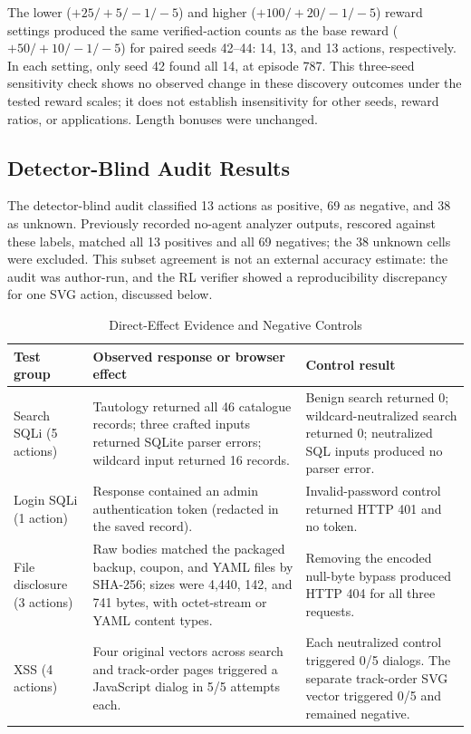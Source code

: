 \documentclass[conference, a4paper]{IEEEtran}
\begin{document}
The lower ($+25/+5/-1/-5$) and higher ($+100/+20/-1/-5$)
reward settings produced the same verified-action counts as the
base reward ($+50/+10/-1/-5$) for paired seeds 42--44: 14, 13,
and 13 actions, respectively. In each setting, only seed 42
found all 14, at episode 787. This three-seed sensitivity check
shows no observed change in these discovery outcomes under the
tested reward scales; it does not establish insensitivity for
other seeds, reward ratios, or applications. Length bonuses
were unchanged.

\subsection{Detector-Blind Audit Results}

The detector-blind audit classified 13 actions as positive, 69 as
negative, and 38 as unknown. Previously recorded no-agent analyzer
outputs, rescored against these labels, matched all 13 positives and all 69
negatives; the 38 unknown cells were excluded. This subset agreement
is not an external accuracy estimate: the audit was author-run, and
the RL verifier showed a reproducibility discrepancy for one SVG
action, discussed below.

\begin{table}[!t]
\caption{Direct-Effect Evidence and Negative Controls}
\label{tab:oracle-evidence}
\centering
\scriptsize
\begin{tabular}{p{}p{}p{}}
\toprule
\textbf{Test group} & \textbf{Observed response or browser effect} & \textbf{Control result}\\
\midrule
Search SQLi (5 actions) & Tautology returned all 46 catalogue records; three crafted inputs returned SQLite parser errors; wildcard input returned 16 records. & Benign search returned 0; wildcard-neutralized search returned 0; neutralized SQL inputs produced no parser error.\\
Login SQLi (1 action) & Response contained an admin authentication token (redacted in the saved record). & Invalid-password control returned HTTP 401 and no token.\\
File disclosure (3 actions) & Raw bodies matched the packaged backup, coupon, and YAML files by SHA-256; sizes were 4,440, 142, and 741 bytes, with octet-stream or YAML content types. & Removing the encoded null-byte bypass produced HTTP 404 for all three requests.\\
XSS (4 actions) & Four original vectors across search and track-order pages triggered a JavaScript dialog in 5/5 attempts each. & Each neutralized control triggered 0/5 dialogs. The separate track-order SVG vector triggered 0/5 and remained negative.\\
\bottomrule
\end{tabular}
\end{table}
\end{document}
